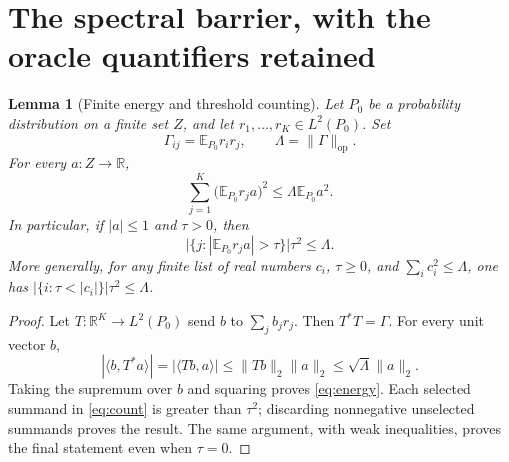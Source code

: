 \documentclass[11pt]{article}
\newtheorem{lemma}[theorem]{Lemma}
\newcommand{\R}{\mathbb R}
\newcommand{\E}{\mathbb E}
\newcommand{\1}{\mathbf 1}
\newcommand{\op}{\mathrm{op}}
\begin{document}
\section{The spectral barrier, with the oracle quantifiers retained}
\begin{lemma}[Finite energy and threshold counting]\label{thm:energy}
Let $P_0$ be a probability distribution on a finite set $Z$, and let $r_1,\ldots,r_K\in L^2(P_0)$. Set
\[
 \Gamma_{ij}=\E_{P_0}r_i r_j,\qquad \Lambda=\|\Gamma\|_\op.
\]
For every $a:Z\to\R$,
\begin{equation}\label{eq:energy}
 \sum_{j=1}^K\bigl(\E_{P_0}r_j a\bigr)^2
 \leq\Lambda\E_{P_0}a^2.
\end{equation}
In particular, if $|a|\leq1$ and $\tau>0$, then
\begin{equation}\label{eq:count}
 \bigl|\{j:|\E_{P_0}r_j a|>\tau\}\bigr|\tau^2\leq\Lambda.
\end{equation}
More generally, for any finite list of real numbers $c_i$, $\tau\geq0$, and $\sum_i c_i^2\leq\Lambda$, one has $|\{i:\tau<|c_i|\}|\tau^2\leq\Lambda$.
\end{lemma}
\begin{proof}
Let $T:\R^K\to L^2(P_0)$ send $b$ to $\sum_jb_jr_j$. Then $T^*T=\Gamma$. For every unit vector $b$,
\[
 |\langle b,T^*a\rangle|=|\langle Tb,a\rangle|
 \leq\|Tb\|_2\|a\|_2\leq\sqrt\Lambda\|a\|_2.
\]
Taking the supremum over $b$ and squaring proves \eqref{eq:energy}. Each selected summand in \eqref{eq:count} is greater than $\tau^2$; discarding nonnegative unselected summands proves the result. The same argument, with weak inequalities, proves the final statement even when $\tau=0$.
\end{proof}
\end{document}
